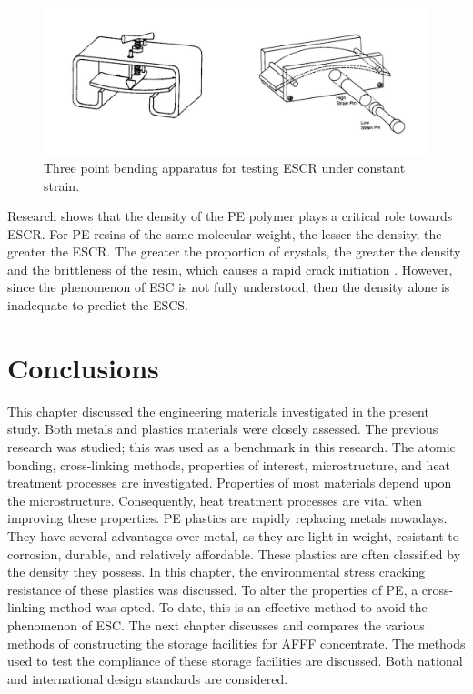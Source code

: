 \documentclass[12pt]{report}
\begin{document}
\begin{figure}[H]
    \centering
    \includegraphics[width=.8\textwidth]{three_point_bending_apparatus_for_testing_escr.jpg}
    \caption{Three point bending apparatus for testing ESCR under constant strain. \cite{choi2009modeling}}
    \label{ch3:figure:bending_apparatus}
\end{figure}

Research shows that the density of the PE polymer plays a critical role towards ESCR. For PE resins of the same molecular weight, the lesser the density, the greater the ESCR. The greater the proportion of crystals, the greater the density and the brittleness of the resin, which causes a rapid crack initiation \cite{gabriel1998history}. However, since the phenomenon of ESC is not fully understood, then the density alone is inadequate to predict the ESCS. 

\section{Conclusions}
This chapter discussed the engineering materials investigated in the present study. Both metals and plastics materials were closely assessed. The previous research was studied; this was used as a benchmark in this research. The atomic bonding, cross-linking methods, properties of interest, microstructure, and heat treatment processes are investigated. Properties of most materials depend upon the microstructure. Consequently, heat treatment processes are vital when improving these properties.
PE plastics are rapidly replacing metals nowadays. They have several advantages over metal, as they are light in weight, resistant to corrosion, durable, and relatively affordable. These plastics are often classified by the density they possess. In this chapter, the environmental stress cracking resistance of these plastics was discussed. To alter the properties of PE, a cross-linking method was opted. To date, this is an effective method to avoid the phenomenon of ESC.
The next chapter discusses and compares the various methods of constructing the storage facilities for AFFF concentrate. The methods used to test the compliance of these storage facilities are discussed. Both national and international design standards are considered.
\end{document}
